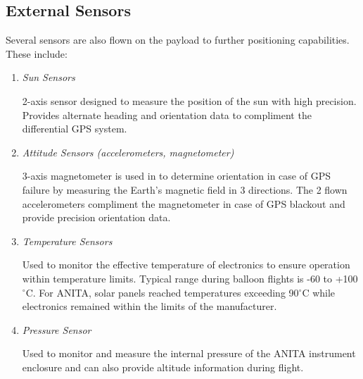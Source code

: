 \subsection{External Sensors}
\label{ss:sensors}
Several sensors are also flown on the payload to further positioning capabilities.  These include:

\begin{enumerate}
\item \emph{Sun Sensors} \par 2-axis sensor designed to measure the position of the sun with high precision.  Provides alternate heading and orientation data to compliment the differential GPS system.
\item \emph{Attitude Sensors (accelerometers, magnetometer)} \par 3-axis magnetometer is used in to determine orientation in case of GPS failure by measuring the Earth's magnetic field in 3 directions.  The 2 flown accelerometers compliment the magnetometer in case of GPS blackout and provide precision orientation data.
\item \emph{Temperature Sensors} \par Used to monitor the effective temperature of electronics to ensure operation within temperature limits.  Typical range during balloon flights is -60 to +100$^{\circ}$C.  For ANITA, solar panels reached temperatures exceeding 90$^{\circ}$C while electronics remained within the limits of the manufacturer.
\item \emph{Pressure Sensor} \par Used to monitor and measure the internal pressure of the ANITA instrument enclosure and can also provide altitude information during flight.
\end{enumerate}